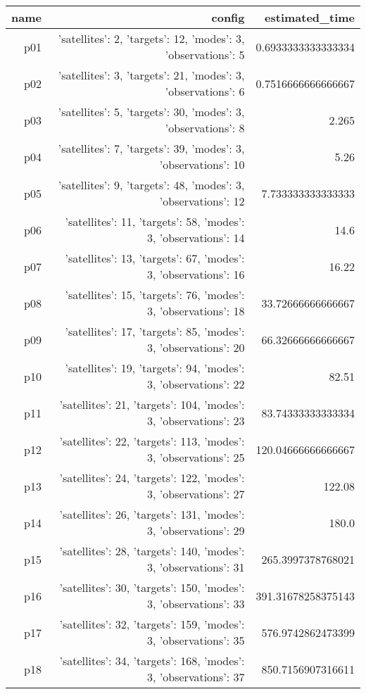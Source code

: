 \documentclass{article}
\begin{document}
                            \begin{center}
                            \scriptsize
                            \begin{tabular}{r|r|r}
                            name & config & estimated\_time\\\midrule
                              p01&{'satellites': 2, 'targets': 12, 'modes': 3, 'observations': 5}&0.6933333333333334\\
  p02&{'satellites': 3, 'targets': 21, 'modes': 3, 'observations': 6}&0.7516666666666667\\
  p03&{'satellites': 5, 'targets': 30, 'modes': 3, 'observations': 8}&2.265\\
  p04&{'satellites': 7, 'targets': 39, 'modes': 3, 'observations': 10}&5.26\\
  p05&{'satellites': 9, 'targets': 48, 'modes': 3, 'observations': 12}&7.733333333333333\\
  p06&{'satellites': 11, 'targets': 58, 'modes': 3, 'observations': 14}&14.6\\
  p07&{'satellites': 13, 'targets': 67, 'modes': 3, 'observations': 16}&16.22\\
  p08&{'satellites': 15, 'targets': 76, 'modes': 3, 'observations': 18}&33.72666666666667\\
  p09&{'satellites': 17, 'targets': 85, 'modes': 3, 'observations': 20}&66.32666666666667\\
  p10&{'satellites': 19, 'targets': 94, 'modes': 3, 'observations': 22}&82.51\\
  p11&{'satellites': 21, 'targets': 104, 'modes': 3, 'observations': 23}&83.74333333333334\\
  p12&{'satellites': 22, 'targets': 113, 'modes': 3, 'observations': 25}&120.04666666666667\\
  p13&{'satellites': 24, 'targets': 122, 'modes': 3, 'observations': 27}&122.08\\
  p14&{'satellites': 26, 'targets': 131, 'modes': 3, 'observations': 29}&180.0\\
  p15&{'satellites': 28, 'targets': 140, 'modes': 3, 'observations': 31}&265.3997378768021\\
  p16&{'satellites': 30, 'targets': 150, 'modes': 3, 'observations': 33}&391.31678258375143\\
  p17&{'satellites': 32, 'targets': 159, 'modes': 3, 'observations': 35}&576.9742862473399\\
  p18&{'satellites': 34, 'targets': 168, 'modes': 3, 'observations': 37}&850.7156907316611\\

\end{tabular}
\end{center}
\end{document}
